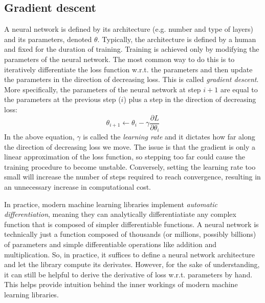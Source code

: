 \documentclass[12pt]{article}
\begin{document}
\subsection{Gradient descent}

A neural network is defined by its architecture (e.g. number and type of layers) and its parameters, denoted $\theta$. Typically, the architecture is defined by a human and fixed for the duration of training. Training is achieved only by modifying the parameters of the neural network. The most common way to do this is to iteratively differentiate the loss function w.r.t. the parameters and then update the parameters in the direction of decreasing loss. This is called \textit{gradient descent}. More specifically, the parameters of the neural network at step $i+1$ are equal to the parameters at the previous step ($i$) plus a step in the direction of decreasing loss:
$$
\theta_{i+1} \leftarrow \theta_{i} - \gamma \frac{\partial L}{\partial \theta_i} \label{eq_sgd}
$$
In the above equation, $\gamma$ is called the \textit{learning rate} and it dictates how far along the direction of decreasing loss we move. The issue is that the gradient is only a linear approximation of the loss function, so stepping too far could cause the training procedure to become unstable. Conversely, setting the learning rate too small will increase the number of steps required to reach convergence, resulting in an unnecessary increase in computational cost.

In practice, modern machine learning libraries implement \textit{automatic differentiation}, meaning they can analytically differentiatiate any complex function that is composed of simpler differentiable functions. A neural network is technically just a function composed of thousands (or millions, possibly billions) of parameters and simple differentiable operations like addition and multiplication. So, in practice, it suffices to define a neural network architecture and let the library compute its derivates. However, for the sake of understanding, it can still be helpful to derive the derivative of loss w.r.t. parameters by hand. This helps provide intuition behind the inner workings of modern machine learning libraries.
\end{document}
